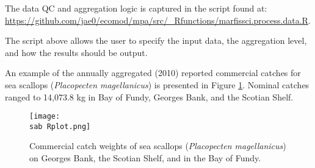 \documentclass[letterpaper,portrait,11pt]{scrartcl}
\numberwithin{equation}{section}		%
\numberwithin{figure}{section}		%
\numberwithin{table}{section}				%
\newcommand{\ecomod}{\string~/ecomod_data/}   %
\newcommand{\sab}{\ecomod/mpa/sab/}   %
\begin{document}
The data QC and aggregation logic is captured in the script found at: \\

\url{https://github.com/jae0/ecomod/mpa/src/\_Rfunctions/marfissci.process.data.R}.

The script above allows the user to specify the input data, the aggregation level, and how the results should be output.

An example of the annually aggregated (2010) reported commercial catches for sea scallops (\textit{Placopecten magellanicus}) is presented in Figure \ref{fig:Scallop}. Nominal catches ranged to 14,073.8  kg in Bay of Fundy, Georges Bank, and the Scotian Shelf.











\begin{figure}[h]
	\centering
 \texttt{[image: \\sab Rplot.png]}
	\caption{Commercial catch weights of sea scallops (\textit{Placopecten magellanicus}) on Georges Bank, the Scotian Shelf, and in the Bay of Fundy.}
		\label{fig:Scallop}
\end{figure}
\end{document}
